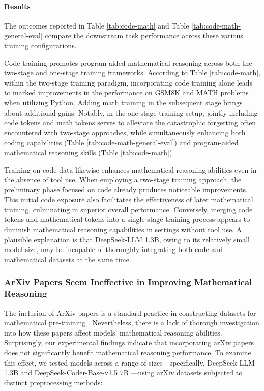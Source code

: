 \begin{itemize}[topsep=0pt]
\paragraph{Results}
The outcomes reported in Table \ref{tab:code-math} and Table \ref{tab:code-math-general-eval} compare the downstream task performance across these various training configurations.

Code training promotes program-aided mathematical reasoning across both the two-stage and one-stage training frameworks. According to Table \ref{tab:code-math}, within the two-stage training paradigm, incorporating code training alone leads to marked improvements in the performance on GSM8K and MATH problems when utilizing Python. Adding math training in the subsequent stage brings about additional gains. Notably, in the one-stage training setup, jointly including code tokens and math tokens serves to alleviate the catastrophic forgetting often encountered with two-stage approaches, while simultaneously enhancing both coding capabilities (Table \ref{tab:code-math-general-eval}) and program-aided mathematical reasoning skills (Table \ref{tab:code-math}).

Training on code data likewise enhances mathematical reasoning abilities even in the absence of tool use. When employing a two-stage training approach, the preliminary phase focused on code already produces noticeable improvements. This initial code exposure also facilitates the effectiveness of later mathematical training, culminating in superior overall performance. Conversely, merging code tokens and mathematical tokens into a single-stage training process appears to diminish mathematical reasoning capabilities in settings without tool use. A plausible explanation is that DeepSeek-LLM 1.3B, owing to its relatively small model size, may be incapable of thoroughly integrating both code and mathematical datasets at the same time.

\subsubsection{ArXiv Papers Seem Ineffective in Improving Mathematical Reasoning}

The inclusion of ArXiv papers is a standard practice in constructing datasets for mathematical pre-training \citep{minerva,gpt-f,llemma,mathpile}. Nevertheless, there is a lack of thorough investigation into how these papers affect models' mathematical reasoning abilities. Surprisingly, our experimental findings indicate that incorporating arXiv papers does not significantly benefit mathematical reasoning performance. To examine this effect, we tested models across a range of sizes—specifically, DeepSeek-LLM 1.3B and DeepSeek-Coder-Base-v1.5 7B \citep{deepseek-coder}—using arXiv datasets subjected to distinct preprocessing methods:


\end{itemize}
